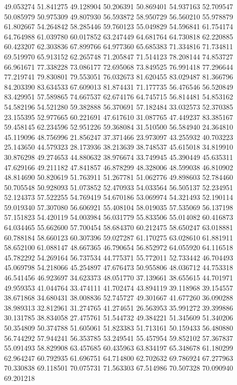 49.053274
51.841275
49.128904
50.206391
50.869401
54.937163
52.709547
50.085979
50.975309
49.807930
56.593872
58.950729
56.560210
55.978879
61.802667
54.264842
58.285446
59.760123
55.049829
54.596841
61.754174
64.764988
61.039780
60.017852
63.247449
64.681764
64.730818
62.220885
60.423207
62.303836
67.899766
64.977360
65.685383
71.334816
71.734811
69.519970
65.913152
62.265748
71.205847
71.514123
78.208144
74.853727
66.961671
77.338228
73.086177
72.695068
73.849525
76.991418
77.296644
77.219741
79.830801
79.553051
76.032673
81.620455
83.029487
81.366796
84.203390
83.634533
67.609013
81.874431
71.177735
56.476546
56.520849
83.429951
57.589865
74.667537
62.674176
64.745715
56.814481
54.853162
54.582196
54.521280
59.382888
56.370691
57.182484
33.032573
52.370385
23.155395
52.977665
60.221691
47.617610
31.087765
47.449237
83.385167
59.458145
62.234596
52.951226
59.368084
31.510500
56.584940
24.364810
45.119096
48.756996
21.856247
37.371466
23.973097
43.255932
40.703223
25.143650
44.579323
28.173936
38.213639
38.748537
45.615018
34.819910
30.876298
49.274653
44.880632
38.976674
33.749945
45.390449
45.635311
47.629166
49.211182
47.841857
46.878299
48.328006
48.599038
46.810902
48.814690
50.820619
51.763911
51.267781
51.062776
49.898603
52.784460
50.705548
50.928093
51.073852
52.470933
54.033564
56.505137
52.234951
52.124373
57.522255
54.769419
54.670186
53.069974
54.321493
52.190114
59.019340
57.307080
56.606921
55.408104
58.019035
57.535069
56.137198
57.151823
54.420119
54.003984
56.031779
55.833506
55.014082
60.416873
64.034465
55.662600
57.700454
58.684370
60.212475
58.650247
63.018881
60.788184
58.660123
60.307396
59.027287
61.170275
63.028610
61.881911
58.652100
61.088147
48.667365
46.790654
56.852972
64.055920
64.116518
45.782292
54.269164
56.737534
44.775371
55.772011
52.733442
46.704493
45.069798
54.218066
45.254897
47.676473
50.955806
48.036712
44.753318
46.541456
46.923697
34.623373
48.051770
37.139661
38.655615
44.701971
49.959353
41.044764
33.474111
41.702474
43.894119
39.118968
39.154557
38.671868
34.680431
38.008836
52.745727
49.301667
41.677260
36.090288
38.989313
32.812961
31.274765
41.274651
26.563953
35.991272
39.399886
30.131785
38.834058
27.475761
51.544732
49.384221
51.345609
51.340206
50.354809
50.374788
51.605061
51.823383
51.713161
50.159433
56.480880
56.744292
57.944241
56.353785
53.249541
55.457954
59.852102
57.367837
55.091493
58.829908
63.457685
60.435963
63.834197
65.348678
61.180299
62.964247
60.792935
61.696751
64.714800
62.702632
69.786924
67.277963
70.330838
69.118501
70.075731
71.563303
67.514986
70.507328
70.090940
69.201218
